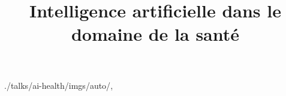 

\title{Intelligence artificielle dans le domaine de la santé}


\usefootlinefortitlepage

\begin{graphicspathcontext}{{./talks/ai-health/imgs/auto/},\old}
\end{graphicspathcontext}




\endinput
